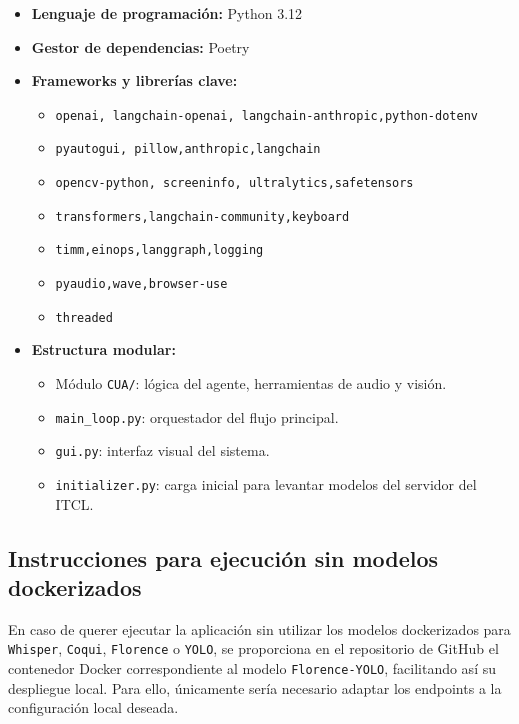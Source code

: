 \begin{itemize}
    \item \textbf{Lenguaje de programación:} Python 3.12
    \item \textbf{Gestor de dependencias:} Poetry
    \item \textbf{Frameworks y librerías clave:}
    \begin{itemize}
        \item \texttt{openai, langchain-openai, langchain-anthropic,python-dotenv}
        \item \texttt{pyautogui, pillow,anthropic,langchain}
        \item \texttt{opencv-python, screeninfo, ultralytics,safetensors}
        \item \texttt{transformers,langchain-community,keyboard}
        \item \texttt{timm,einops,langgraph,logging}
        \item \texttt{pyaudio,wave,browser-use}
        \item \texttt{threaded}
    \end{itemize}
    \item \textbf{Estructura modular:}
    \begin{itemize}
        \item Módulo \texttt{CUA/}: lógica del agente, herramientas de audio y visión.
        \item \texttt{main\_loop.py}: orquestador del flujo principal.
        \item \texttt{gui.py}: interfaz visual del sistema.
        \item \texttt{initializer.py}: carga inicial para levantar modelos del servidor del ITCL.
    \end{itemize}
\end{itemize}

\subsection{Instrucciones para ejecución sin modelos dockerizados}

En caso de querer ejecutar la aplicación sin utilizar los modelos dockerizados para \texttt{Whisper}, \texttt{Coqui}, \texttt{Florence} o \texttt{YOLO}, se proporciona en el repositorio de GitHub el contenedor Docker correspondiente al modelo \texttt{Florence-YOLO}, facilitando así su despliegue local. Para ello, únicamente sería necesario adaptar los endpoints a la configuración local deseada.

